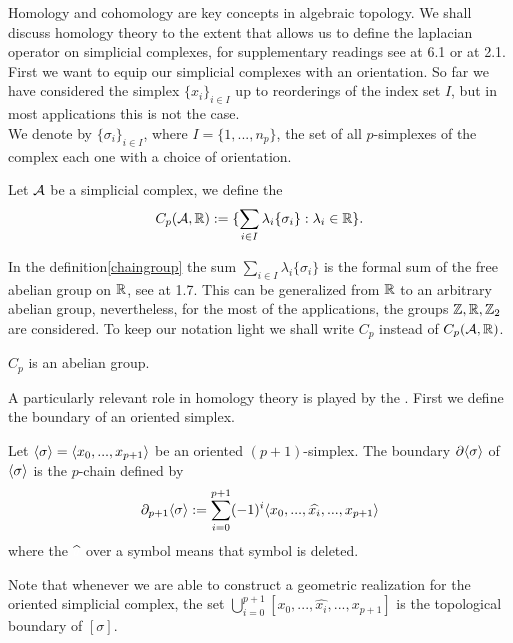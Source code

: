 \documentclass[../1.tex]{subfiles}
\begin{document}
    Homology and cohomology are key concepts in algebraic topology. We shall discuss homology theory to the extent
    that allows us to define the laplacian operator on simplicial complexes, for supplementary readings see \cite{singerthorpe} at 6.1 or \cite{hatcher} at 2.1.
    First we want to equip our simplicial complexes with an orientation. So far we have considered the simplex $\{x_i\}_{i \in I}$ up to reorderings of the index set $I$, but in most applications this is not the case.\\
   
    We denote by $\{\sigma_i\}_{i \in I}$, where $I = \{1,...,n_p\}$, the set of all $p$-simplexes of the complex each one with a choice
    of orientation.

    \begin{defn}
        \label{chaingroup}
        Let $\mathcal{A}$ be a simplicial complex, we define the  
        \[ C_p(\mathcal{A},\mathbb{R}) := \{ \sum_{i \in I} \lambda_i \{\sigma_i\} : \lambda_i \in \mathbb{R} \}.\]
    \end{defn}

    In the definition\autoref{chaingroup} the sum $\sum_{i \in I} \lambda_i \{\sigma_i\}$ is the formal sum of the free abelian group on $\mathbb{R}$, see \cite{lang} at 1.7.
    This can be generalized from $\mathbb{R}$ to an arbitrary abelian group, nevertheless, for the most of the applications, the groups $\mathbb{Z},\mathbb{R},\mathbb{Z}_2$ are considered. To keep our notation light we shall write $C_p$ instead of $C_p(\mathcal{A},\mathbb{R})$.
    
    \begin{prop}
        $C_p$ is an abelian group.
    \end{prop}

    A particularly relevant role in homology theory is played by the . First we define the boundary of an oriented simplex.

    \begin{defn}
        Let $\langle \sigma \rangle = \langle x_0,...,x_{p+1} \rangle$ be an oriented $(p+1)$-simplex. The boundary $\partial\langle \sigma \rangle$ of $\langle \sigma \rangle$ is the $p$-chain
        defined by \[ \partial_{p+1}\langle \sigma \rangle := \sum_{i = 0}^{p+1}(-1)^i\langle x_0,...,\widehat{x_i},...,x_{p+1} \rangle\]
        where the  $\widehat{\color{white} a}$  over a symbol means that symbol is deleted.
    \end{defn}

    \begin{rem}
        Note that whenever we are able to construct a geometric realization for the oriented simplicial complex, the set $\bigcup_{i = 0}^{p+1}[x_0,...,\widehat{x_i},...,x_{p+1}]$
        is the topological boundary of $[\sigma]$.
    \end{rem}
\end{document}
